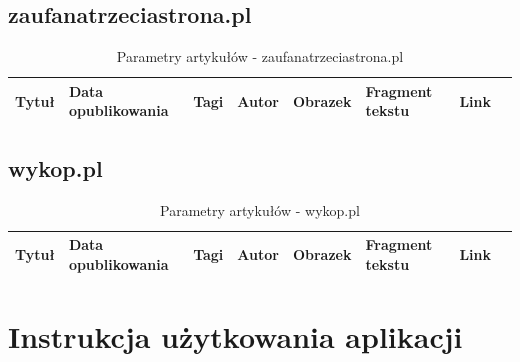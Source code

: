 \documentclass[12pt, titlepage]{article}
\begin{document}
		\subsection{zaufanatrzeciastrona.pl} 
		\begin{table}[H]
			\centering
			\caption{Parametry artykułów - zaufanatrzeciastrona.pl}
			\label{z3s_parametry}
			\begin{tabular}{ | C{1.5cm} | C{4cm} | C{1.5cm} | C{1.5cm} | C{1.5cm} | C{3cm} | C{1.5cm} | @{}m{0pt}@{}}
				\hline
				Tytuł & Data opublikowania & Tagi & Autor & Obrazek & Fragment tekstu & Link &\\[0.5cm]
				\hline
			\end{tabular}
		\end{table}
		\subsection{wykop.pl} 
		\begin{table}[H]
			\centering
			\caption{Parametry artykułów - wykop.pl}
			\label{wykop_parametry}
			\begin{tabular}{ | C{1.5cm} | C{4cm} | C{1.5cm} | C{1.5cm} | C{1.5cm} | C{3cm} | C{1.5cm} | @{}m{0pt}@{}}
				\hline
				Tytuł & Data opublikowania & Tagi & Autor & Obrazek & Fragment tekstu & Link &\\[0.5cm]
				\hline
			\end{tabular}
		\end{table}
	\section{Instrukcja użytkowania aplikacji}
	
\end{document}
